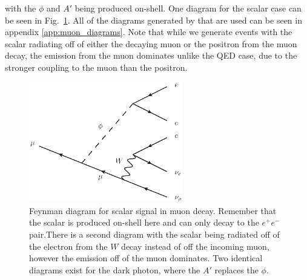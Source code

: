 \noindent with the $\phi$ and $A'$ being produced on-shell.
One diagram for the scalar case can be seen in Fig.\ \ref{fig:mu_eeenunu_scalar}.
All of the diagrams generated by \madgraph that are used can be seen in appendix \ref{app:muon_diagrams}.
Note that while we generate events with the scalar radiating off of either the decaying muon or the positron from the muon decay, the emission from the muon dominates unlike the QED case, due to the stronger coupling to the muon than the positron.

\begin{figure}[h]
    \centering
    \includegraphics[width=0.6\textwidth]{Figures/feynman_diagrams/mu_eeenunu_scalar}
    \caption{Feynman diagram for scalar signal in muon decay. Remember that the scalar is produced on-shell here and can only decay to the $e^+ e^-$ pair.There is a second diagram with the scalar being radiated off of the electron from the $W$ decay instead of off the incoming muon, however the emission off of the muon dominates. Two identical diagrams exist for the dark photon, where the $A'$ replaces the $\phi$.}
    \label{fig:mu_eeenunu_scalar}
\end{figure}

